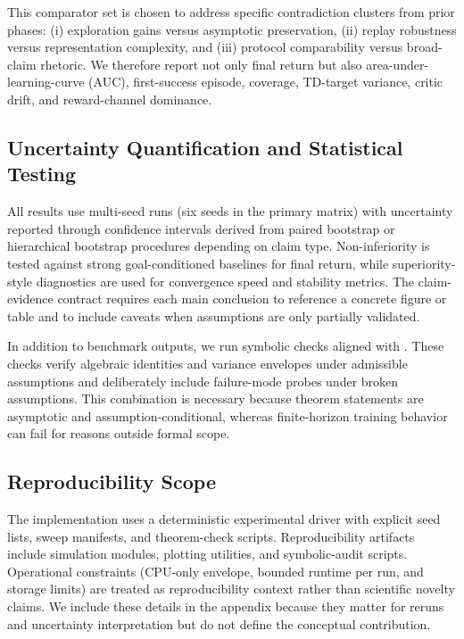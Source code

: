 \documentclass{article} %
\begin{document}
This comparator set is chosen to address specific contradiction clusters from prior phases: (i) exploration gains versus asymptotic preservation, (ii) replay robustness versus representation complexity, and (iii) protocol comparability versus broad-claim rhetoric. We therefore report not only final return but also area-under-learning-curve (AUC), first-success episode, coverage, TD-target variance, critic drift, and reward-channel dominance.

\subsection{Uncertainty Quantification and Statistical Testing}

All results use multi-seed runs (six seeds in the primary matrix) with uncertainty reported through confidence intervals derived from paired bootstrap or hierarchical bootstrap procedures depending on claim type. Non-inferiority is tested against strong goal-conditioned baselines for final return, while superiority-style diagnostics are used for convergence speed and stability metrics. The claim-evidence contract requires each main conclusion to reference a concrete figure or table and to include caveats when assumptions are only partially validated.

In addition to benchmark outputs, we run symbolic checks aligned with . These checks verify algebraic identities and variance envelopes under admissible assumptions and deliberately include failure-mode probes under broken assumptions. This combination is necessary because theorem statements are asymptotic and assumption-conditional, whereas finite-horizon training behavior can fail for reasons outside formal scope.

\subsection{Reproducibility Scope}

The implementation uses a deterministic experimental driver with explicit seed lists, sweep manifests, and theorem-check scripts. Reproducibility artifacts include simulation modules, plotting utilities, and symbolic-audit scripts. Operational constraints (CPU-only envelope, bounded runtime per run, and storage limits) are treated as reproducibility context rather than scientific novelty claims. We include these details in the appendix because they matter for reruns and uncertainty interpretation but do not define the conceptual contribution.
\end{document}
